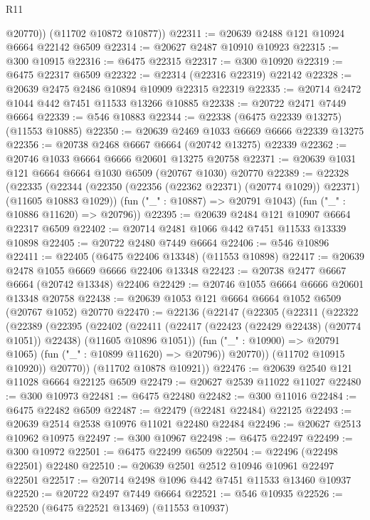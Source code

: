 \begin{lexlean}{R11}
\begin{coremodule}
{{{{{{{{{{{{{{{{{{{{{{{{{{{{{{{{{{{{{{{{{{{{{{{{{{{{{{{{{{{{{{{{{{{{{{{{{{{{{{{{{{          @20770))
      (@11702 @10872 @10877))
@22311 := @20639 @2488 @121 @10924 @6664 @22142 @6509
@22314 := @20627 @2487 @10910 @10923
@22315 := @300 @10915
@22316 := @6475 @22315
@22317 := @300 @10920
@22319 := @6475 @22317 @6509
@22322 := @22314 (@22316 @22319) @22142
@22328 := @20639 @2475 @2486 @10894 @10909 @22315 @22319
@22335 := @20714 @2472 @1044 @442 @7451 @11533 @13266 @10885
@22338 := @20722 @2471 @7449 @6664
@22339 := @546 @10883
@22344 := @22338 (@6475 @22339 @13275) (@11553 @10885)
@22350 := @20639 @2469 @1033 @6669 @6666 @22339 @13275
@22356 := @20738 @2468 @6667 @6664 (@20742 @13275) @22339
@22362 := @20746 @1033 @6664 @6666 @20601 @13275 @20758
@22371 := @20639 @1031 @121 @6664 @6664 @1030 @6509 (@20767 @1030) @20770
@22389 := @22328
    (@22335
      (@22344 (@22350 (@22356 (@22362 @22371) (@20774 @1029)) @22371) (@11605 @10883 @1029))
      (fun ("_" : @10887) => @20791 @1043)
      (fun ("_" : @10886 @11620) => @20796))
@22395 := @20639 @2484 @121 @10907 @6664 @22317 @6509
@22402 := @20714 @2481 @1066 @442 @7451 @11533 @13339 @10898
@22405 := @20722 @2480 @7449 @6664
@22406 := @546 @10896
@22411 := @22405 (@6475 @22406 @13348) (@11553 @10898)
@22417 := @20639 @2478 @1055 @6669 @6666 @22406 @13348
@22423 := @20738 @2477 @6667 @6664 (@20742 @13348) @22406
@22429 := @20746 @1055 @6664 @6666 @20601 @13348 @20758
@22438 := @20639 @1053 @121 @6664 @6664 @1052 @6509 (@20767 @1052) @20770
@22470 := @22136
    (@22147
      (@22305
        (@22311
          (@22322
            (@22389
              (@22395
                (@22402
                  (@22411
                    (@22417 (@22423 (@22429 @22438) (@20774 @1051)) @22438)
                    (@11605 @10896 @1051))
                  (fun ("_" : @10900) => @20791 @1065)
                  (fun ("_" : @10899 @11620) => @20796))
                @20770))
            (@11702 @10915 @10920))
          @20770))
      (@11702 @10878 @10921))
@22476 := @20639 @2540 @121 @11028 @6664 @22125 @6509
@22479 := @20627 @2539 @11022 @11027
@22480 := @300 @10973
@22481 := @6475 @22480
@22482 := @300 @11016
@22484 := @6475 @22482 @6509
@22487 := @22479 (@22481 @22484) @22125
@22493 := @20639 @2514 @2538 @10976 @11021 @22480 @22484
@22496 := @20627 @2513 @10962 @10975
@22497 := @300 @10967
@22498 := @6475 @22497
@22499 := @300 @10972
@22501 := @6475 @22499 @6509
@22504 := @22496 (@22498 @22501) @22480
@22510 := @20639 @2501 @2512 @10946 @10961 @22497 @22501
@22517 := @20714 @2498 @1096 @442 @7451 @11533 @13460 @10937
@22520 := @20722 @2497 @7449 @6664
@22521 := @546 @10935
@22526 := @22520 (@6475 @22521 @13469) (@11553 @10937)
}}}}}}}}}}}}}}}}}}}}}}}}}}}}}}}}}}}}}}}}}}}}}}}}}}}}}}}}}}}}}}}}}}}}}}}}}}}}}}}}}}
\end{coremodule}
\end{lexlean}
